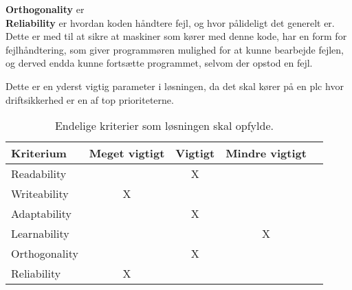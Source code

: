 \noindent\textbf{Orthogonality} er\\

\noindent\textbf{Reliability} er hvordan koden håndtere fejl, og hvor pålideligt det generelt er. Dette er med til at sikre at maskiner som kører med denne kode, har en form for fejlhåndtering, som giver programmøren mulighed for at kunne bearbejde fejlen, og derved endda kunne fortsætte programmet, selvom der opstod en fejl.

Dette er en yderst vigtig parameter i løsningen, da det skal kører på en \gls{plc} hvor driftsikkerhed er en af top prioriteterne.\\


\begin{table}[H]
\centering       
{}
\begin{tabular}{l c c c c}
\toprule
\textbf{Kriterium} & \textbf{Meget vigtigt} & \textbf{Vigtigt} & \textbf{Mindre vigtigt}  \\ \midrule
Readability        &   & X &       \\ 
Writeability       & X &   &       \\ 
Adaptability       &   & X &       \\ 
Learnability       &   &   & X     \\ 
Orthogonality      &   & X &       \\ 
Reliability        & X &   &       \\ \bottomrule
\end{tabular}
\caption{Endelige kriterier som løsningen skal opfylde.}
\label{table:kriterier}
\end{table}